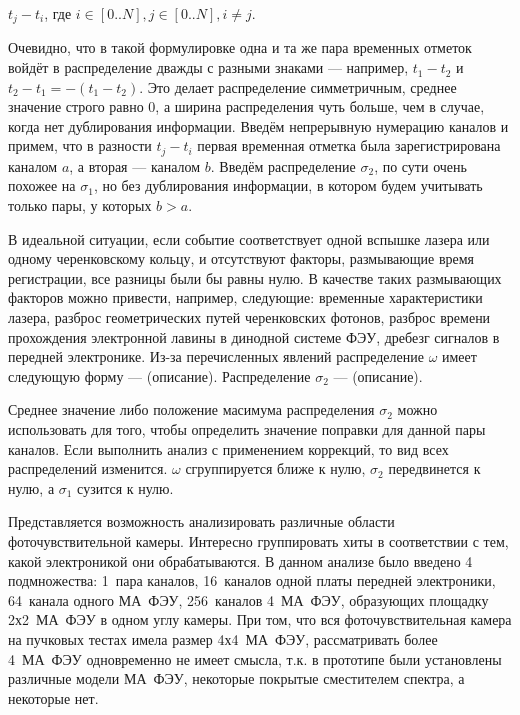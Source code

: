 {\centering
$ t_{j}-t_{i} $, где $ i \in [0..N], j \in [0..N], i \neq j $.\\
}

Очевидно, что в такой формулировке одна и та же пара временных отметок войдёт в распределение дважды с разными знаками --- например, $ t_{1}-t_{2} $ и $ t_{2}-t_{1} = -(t_{1}-t_{2}) $. Это делает распределение симметричным, среднее значение строго равно 0, а ширина распределения чуть больше, чем в случае, когда нет дублирования информации. Введём непрерывную нумерацию каналов и примем, что в разности $ t_{j}-t_{i} $ первая временная отметка была зарегистрирована каналом $a$, а вторая --- каналом $b$. Введём распределение $ \sigma_{2} $, по сути очень похожее на $ \sigma_{1} $, но без дублирования информации, в котором будем учитывать только пары, у которых $ b > a $.

В идеальной ситуации, если событие соответствует одной вспышке лазера или одному черенковскому кольцу, и отсутствуют факторы, размывающие время регистрации, все разницы были бы равны нулю. В качестве таких размывающих факторов можно привести, например, следующие: временные характеристики лазера, разброс геометрических путей черенковских фотонов, разброс времени прохождения электронной лавины в динодной системе ФЭУ, дребезг сигналов в передней электронике. Из-за перечисленных явлений распределение $ \omega $ имеет следующую форму --- (описание). Распределение $ \sigma_{2} $ --- (описание).


Среднее значение либо положение масимума распределения $ \sigma_{2} $ можно использовать для того, чтобы определить значение поправки для данной пары каналов. Если выполнить анализ с применением коррекций, то вид всех распределений изменится. $ \omega $ сгруппируется ближе к нулю, $ \sigma_{2} $ передвинется к нулю, а $ \sigma_{1} $ сузится к нулю.

Представляется возможность анализировать различные области фоточувствительной камеры. Интересно группировать хиты в соответствии с тем, какой электроникой они обрабатываются. В данном анализе было введено 4 подмножества: 1~пара каналов, 16~каналов одной платы передней электроники, 64~канала одного МА~ФЭУ, 256~каналов 4~МА~ФЭУ, образующих площадку 2х2~МА~ФЭУ в одном углу камеры. При том, что вся фоточувствительная камера на пучковых тестах имела размер 4х4~МА~ФЭУ, рассматривать более 4~МА~ФЭУ одновременно не имеет смысла, т.к. в прототипе были установлены различные модели МА~ФЭУ, некоторые покрытые сместителем спектра, а некоторые нет.

